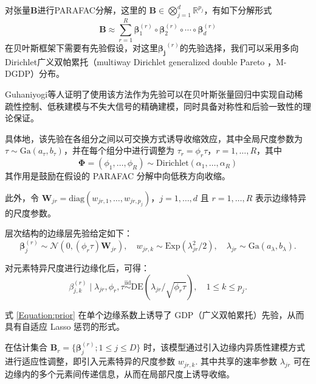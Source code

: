 \documentclass[AutoFakeBold]{LZUThesis}
\newcommand{\scite}[1]{\textsuperscript{\cite{#1}}}
\begin{document}
对张量$\boldsymbol{B}$进行PARAFAC分解，这里的
$\boldsymbol{B} \in \bigotimes_{j=1}^{d} \mathbb{R}^{p_j}$，有如下分解形式
\begin{equation}
	\boldsymbol{B} \approx \sum_{r=1}^{R} \boldsymbol{\beta}_1^{(r)} \circ \boldsymbol{\beta}_2^{(r)} \circ \cdots \circ \boldsymbol{\beta}_d^{(r)}
	\label{Equation:PARAFAC}
\end{equation}
在贝叶斯框架下需要有先验假设，对这里$\boldsymbol{\beta_{j}}^{(r)}$的先验选择，我们可以采用多向Dirichlet广义双帕累托（multiway Dirichlet generalized double Pareto ，M-DGDP）分布\scite{guhaniyogi2017bayesian}。

Guhaniyogi等人证明了\scite{guhaniyogi2017bayesian}使用该方法作为先验可以在贝叶斯张量回归中实现自动稀疏性控制、低秩建模与不失大信号的精确建模，同时具备对称性和后验一致性的理论保证。

具体地，该先验在各组分之间以可交换方式诱导收缩效应，其中全局尺度参数为 \( \tau \sim \mathrm{Ga}(a_\tau, b_\tau) \)，并在每个组分中进行调整为 \( \tau_r = \phi_r \tau \)，\( r = 1, \ldots, R \)，其中
\begin{equation}
	\boldsymbol{\Phi} = (\phi_1, \ldots, \phi_R) \sim \mathrm{Dirichlet}(\alpha_1, \ldots, \alpha_R)
\end{equation}其作用是鼓励在假设的 PARAFAC 分解中向低秩方向收缩。

此外，令 \( \boldsymbol{W}_{jr} = \mathrm{diag}(w_{jr,1}, \ldots, w_{jr, p_j}) \)，\( j = 1, \ldots, d \) 且 \( r = 1, \ldots, R \) 表示边缘特异的尺度参数。

层次结构的边缘层先验给定如下：
\begin{equation}
	\boldsymbol{\beta}^{(r)}_j \sim \mathcal{N}(0, (\phi_r \tau) \boldsymbol{W}_{jr}), 
	\quad w_{jr,k} \sim \mathrm{Exp}(\lambda_{jr}^2 / 2), 
	\quad \lambda_{jr} \sim \mathrm{Ga}(a_\lambda, b_\lambda).
	\label{Equation:prior}
\end{equation}

对元素特异尺度进行边缘化后，可得：
\begin{equation}
	\beta^{(r)}_{j,k} \mid \lambda_{jr}, \phi_r, \tau \overset{\text{iid}}{\sim} \mathrm{DE}(\lambda_{jr} / \sqrt{\phi_r \tau}), \quad 1 \leq k \leq p_j.
\end{equation}

式 \eqref{Equation:prior} 在单个边缘系数上诱导了 GDP（广义双帕累托）先验，从而具有自适应 Lasso 惩罚的形式。

在估计集合 \( \boldsymbol{B}_r = \{ \boldsymbol{\beta}_j^{(r)}; 1 \leq j \leq D \} \) 时，该模型通过引入边缘内异质性建模方式进行适应性调整，即引入元素特异的尺度参数 \( w_{jr,k} \). 其中共享的速率参数 \( \lambda_{jr} \) 可在边缘内的多个元素间传递信息，从而在局部尺度上诱导收缩。
\end{document}
